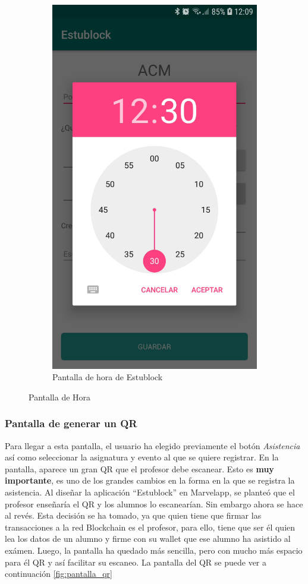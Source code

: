 \begin{figure}[hbt]
\begin{subfigure}[b]{0.4\linewidth}
        \includegraphics[width=0.7\linewidth]{figs/Desarrollo/Interfaz/estublock_crear_evento_hora}
        \caption[Estublock Hora]{Pantalla de hora de Estublock}
	\end{subfigure} 
	\caption[Pantalla de Hora]{Pantalla de Hora}
	\label{fig:pantalla_hora}
\end{figure}

\clearpage
\subsubsection{Pantalla de generar un QR}

Para llegar a esta pantalla, el usuario ha elegido previamente el botón \textit{Asistencia} así como seleccionar la asignatura y evento al que se quiere registrar. En la pantalla, aparece un gran QR que el profesor debe escanear. Esto es \textbf{muy importante}, es uno de los grandes cambios en la forma en la que se registra la asistencia. Al diseñar la aplicación ``Estublock'' en Marvelapp, se planteó que el profesor enseñaría el QR y los alumnos lo escanearían. Sin embargo ahora se hace al revés. Esta decisión se ha tomado, ya que quien tiene que firmar las transacciones a la red Blockchain es el profesor, para ello, tiene que ser él quien lea los datos de un alumno y firme con su wallet que ese alumno ha asistido al exámen. Luego, la pantalla ha quedado más sencilla, pero con mucho más espacio para él QR y así facilitar su escaneo. La pantalla del QR se puede ver a continuación \ref{fig:pantalla_qr}

